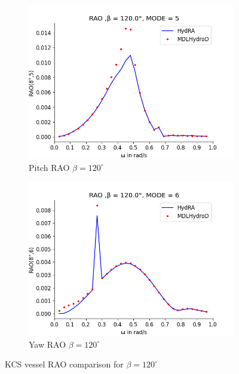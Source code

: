 \begin{figure}[H]
\begin{subfigure}[b]{0.49\textwidth}
        \includegraphics[width=\textwidth]{plots/kvlcc/rao/rao5.png}
        \caption{Pitch RAO $\beta = 120^{\circ}$}
    \end{subfigure}
    \begin{subfigure}[b]{0.49\textwidth}
        \includegraphics[width=\textwidth]{plots/kvlcc/rao/rao6.png}
        \caption{Yaw RAO $\beta = 120^{\circ}$}
    \end{subfigure}
    \caption{KCS vessel RAO comparison for $\beta = 120^{\circ}$}
    \label{fig:kvlcc_rao_120}
\end{figure}
